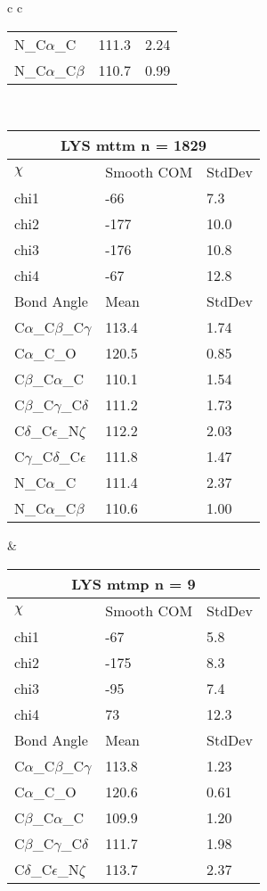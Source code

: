\begin{longtable}{ c c }
\begin{tabular}{ l l l }
  N\_C$\alpha$\_C & 111.3 & 2.24\\
  N\_C$\alpha$\_C$\beta$ & 110.7 & 0.99\\
  \bottomrule
  \end{tabular}
  \\
  \begin{tabular}{ l l l }
  \toprule
  \multicolumn{3}{c}{LYS \textbf{mttm} n = 1829} \\ \toprule
  $\chi$       & Smooth COM & StdDev \\ \midrule
  chi1 & -66 & 7.3 \\ 
  chi2 & -177 & 10.0 \\ 
  chi3 & -176 & 10.8 \\ 
  chi4 & -67 & 12.8 \\ \midrule
  Bond Angle   & Mean     & StdDev \\ \midrule
  C$\alpha$\_C$\beta$\_C$\gamma$ & 113.4 & 1.74\\
  C$\alpha$\_C\_O & 120.5 & 0.85\\
  C$\beta$\_C$\alpha$\_C & 110.1 & 1.54\\
  C$\beta$\_C$\gamma$\_C$\delta$ & 111.2 & 1.73\\
  C$\delta$\_C$\epsilon$\_N$\zeta$ & 112.2 & 2.03\\
  C$\gamma$\_C$\delta$\_C$\epsilon$ & 111.8 & 1.47\\
  N\_C$\alpha$\_C & 111.4 & 2.37\\
  N\_C$\alpha$\_C$\beta$ & 110.6 & 1.00\\
  \bottomrule
  \end{tabular}
  &
  \begin{tabular}{ l l l }
  \toprule
  \multicolumn{3}{c}{LYS \textbf{mtmp} n = 9} \\ \toprule
  $\chi$       & Smooth COM & StdDev \\ \midrule
  chi1 & -67 & 5.8 \\ 
  chi2 & -175 & 8.3 \\ 
  chi3 & -95 & 7.4 \\ 
  chi4 & 73 & 12.3 \\ \midrule
  Bond Angle   & Mean     & StdDev \\ \midrule
  C$\alpha$\_C$\beta$\_C$\gamma$ & 113.8 & 1.23\\
  C$\alpha$\_C\_O & 120.6 & 0.61\\
  C$\beta$\_C$\alpha$\_C & 109.9 & 1.20\\
  C$\beta$\_C$\gamma$\_C$\delta$ & 111.7 & 1.98\\
  C$\delta$\_C$\epsilon$\_N$\zeta$ & 113.7 & 2.37\\

\end{tabular}
\end{longtable}
